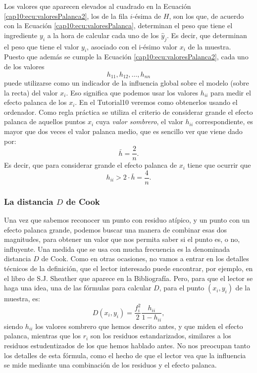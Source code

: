 Los valores que aparecen elevados al cuadrado en la Ecuación \ref{cap10:ecu:valoresPalanca2}, los de la fila $i$-ésima de $H$, son los que, de acuerdo con la Ecuación \ref{cap10:ecu:valoresPalanca}, determinan el peso que tiene el ingrediente $y_i$ a la hora de calcular cada uno de los $\hat y_j$. Es decir, que determinan el peso que tiene el valor $y_i$, asociado con el i-ésimo valor $x_i$ de la muestra. Puesto que además se cumple la Ecuación \ref{cap10:ecu:valoresPalanca2}, cada uno de los valores
\[h_{11}, h_{12}, \ldots, h_{nn}\]
puede utilizarse como un indicador de la influencia global sobre el modelo (sobre la recta) del valor $x_i$. Eso significa que podemos usar los valores $h_{ii}$ para medir el efecto palanca de los $x_i$. En el Tutorial10 veremos como obtenerlos usando el ordenador. Como regla práctica se utiliza el criterio de considerar grande el efecto palanca de aquellos puntos $x_i$ cuya {\em valor sombrero}, el valor $h_{ii}$ correspondiente, es mayor que dos veces el {\sf valor palanca medio}, que es sencillo ver que viene dado por:
\[
\bar h=\dfrac{2}{n}.
\]
Es decir, que para considerar grande el efecto palanca de $x_i$ tiene que ocurrir que
\[
h_{ii}>2\cdot \bar h=\dfrac{4}{n}.
\]

\subsubsection{La distancia $D$ de Cook}

Una vez que sabemos reconocer un punto con residuo atípico, y un punto con un efecto palanca grande, podemos buscar una manera de combinar esas dos magnitudes, para obtener un valor que nos permita saber si el punto es, o no, influyente. Una medida que se usa con mucha frecuencia es la denominada {\sf distancia $D$ de Cook}. Como en otras ocasiones, no vamos a entrar en los detalles técnicos de la definición, que el lector interesado puede encontrar, por ejemplo, en el libro \cite{sheather2009modern} de S.J. Sheather que aparece en la Bibliografía. Pero, para que el lector se haga una idea, una de las fórmulas para calcular $D$, para el punto $(x_i,y_i)$ de la muestra, es:
\[D(x_i,y_i)=\dfrac{f_i^2}{2}\dfrac{h_{ii}}{1-h_{ii}},\]
siendo $h_{ii}$ los valores sombrero que hemos descrito antes, y que miden el efecto palanca, mientras que los $r_i$ son los {\sf residuos estandarizados}, similares a los residuos estudentizados de los que hemos hablado antes.  No nos preocupan tanto los detalles de esta fórmula, como el hecho de que el lector vea que la influencia se mide mediante una combinación de los residuos y el efecto palanca.

